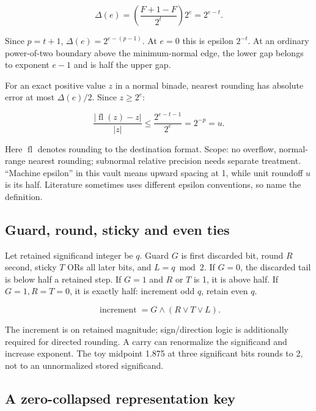 \[
\Delta(e)=\left(\frac{F+1-F}{2^t}\right)2^e=2^{e-t}.
\]

Since \(p=t+1\), \(\Delta(e)=2^{e-(p-1)}\). At \(e=0\) this is epsilon \(2^{-t}\). At an ordinary power-of-two boundary above the minimum-normal edge, the lower gap belongs to exponent \(e-1\) and is half the upper gap.

For an exact positive value \(z\) in a normal binade, nearest rounding has absolute error at most \(\Delta(e)/2\). Since \(z\ge2^e\):

\[
\frac{|\operatorname{fl}(z)-z|}{|z|}
\le\frac{2^{e-t-1}}{2^e}=2^{-p}=u.
\]

Here \(\operatorname{fl}\) denotes rounding to the destination format. Scope: no overflow, normal-range nearest rounding; subnormal relative precision needs separate treatment. ``Machine epsilon'' in this vault means upward spacing at 1, while unit roundoff \(u\) is its half. Literature sometimes uses different epsilon conventions, so name the definition.

\subsection{Guard, round, sticky and even ties}\label{01-foundations-i-ch011-guard-round-sticky-and-even-ties}

\hypertarget{01-foundations-i-ch011-guard-round-sticky-and-even-ties}{}

Let retained significand integer be \(q\). Guard \(G\) is first discarded bit, round \(R\) second, sticky \(T\) ORs all later bits, and \(L=q\bmod2\). If \(G=0\), the discarded tail is below half a retained step. If \(G=1\) and \(R\) or \(T\) is 1, it is above half. If \(G=1,R=T=0\), it is exactly half: increment odd \(q\), retain even \(q\).

\[
\operatorname{increment}=G\land(R\lor T\lor L).
\]

The increment is on retained magnitude; sign/direction logic is additionally required for directed rounding. A carry can renormalize the significand and increase exponent. The toy midpoint 1.875 at three significant bits rounds to 2, not to an unnormalized stored significand.

\subsection{A zero-collapsed representation key}\label{01-foundations-i-ch011-a-zero-collapsed-representation-key}

\hypertarget{01-foundations-i-ch011-a-zero-collapsed-representation-key}{}

